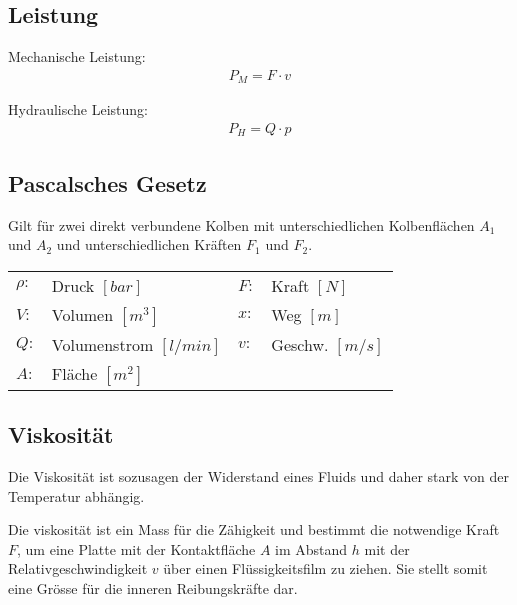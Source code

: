 \subsection{Leistung}
Mechanische Leistung:
\begin{align*}
P_M = F \cdot v
\end{align*}

Hydraulische Leistung:
\begin{align*}
P_H = Q \cdot p
\end{align*}


%




\subsection{Pascalsches Gesetz}
Gilt für zwei direkt verbundene Kolben mit unterschiedlichen Kolbenflächen $A_1$ und $A_2$ und unterschiedlichen Kräften $F_1$ und $F_2$. 
\begin{tabular}{llll}
$\rho:$ & Druck $[bar]$ & $F:$ & Kraft $[N]$ \\
$V:$ & Volumen $[m^3]$ & $x:$ & Weg $[m]$ \\
$Q:$ & Volumenstrom $[l/min]$ & $v:$ & Geschw. $[m/s]$\\
$A:$ & Fläche $[m^2]$
\end{tabular}

\vfill
\columnbreak
\subsection{Viskosität}
Die Viskosität ist sozusagen der Widerstand eines Fluids und daher stark von der Temperatur abhängig.


Die viskosität ist ein Mass für die Zähigkeit und bestimmt die notwendige Kraft $F$, um eine Platte mit der Kontaktfläche $A$ im Abstand $h$ mit der Relativgeschwindigkeit $v$ über einen Flüssigkeitsfilm zu ziehen. Sie stellt somit eine Grösse für die inneren Reibungskräfte dar. 

